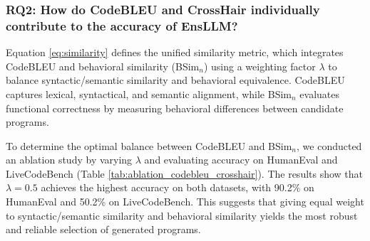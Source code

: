 \documentclass{article}
\newcommand{\tool}{EnsLLM}
\begin{document}
\begin{table}[t!]
    \centering
    \caption{Impact of different CodeBLEU weighting configurations on accuracy.}
    \label{tab:codebleu_variants}
\end{table}

\subsubsection{RQ2: How do CodeBLEU and CrossHair individually contribute to the accuracy of \tool?} 

\leavevmode\par
Equation \ref{eq:similarity} defines the unified similarity metric, which integrates CodeBLEU and behavioral similarity (BSim\(_n\)) using a weighting factor \(\lambda\) to balance syntactic/semantic similarity and behavioral equivalence. CodeBLEU captures lexical, syntactical, and semantic alignment, while BSim\(_n\) evaluates functional correctness by measuring behavioral differences between candidate programs.

To determine the optimal balance between CodeBLEU and BSim\(_n\), we conducted an ablation study by varying \(\lambda\) and evaluating accuracy on HumanEval and LiveCodeBench (Table \ref{tab:ablation_codebleu_crosshair}). The results show that \(\lambda = 0.5\) achieves the highest accuracy on both datasets, with 90.2\% on HumanEval and 50.2\% on LiveCodeBench. This suggests that giving equal weight to syntactic/semantic similarity and behavioral similarity yields the most robust and reliable selection of generated programs.
\end{document}
